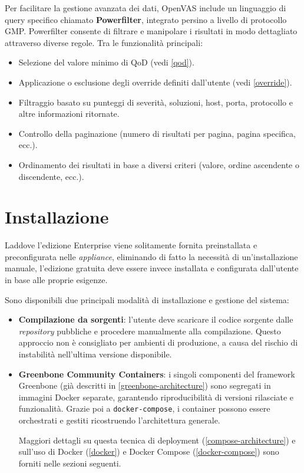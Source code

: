 Per facilitare la gestione avanzata dei dati, OpenVAS include un linguaggio di query specifico chiamato \textbf{Powerfilter}, integrato persino a livello di protocollo GMP. Powerfilter consente di filtrare e manipolare i risultati in modo dettagliato attraverso diverse regole. Tra le funzionalità principali:
\begin{itemize}
    \item Selezione del valore minimo di QoD (vedi \ref{qod}).
    \item Applicazione o esclusione degli override definiti dall'utente (vedi \ref{override}).
    \item Filtraggio basato su punteggi di severità, soluzioni, host, porta, protocollo e altre informazioni ritornate.
    \item Controllo della paginazione (numero di risultati per pagina, pagina specifica, ecc.).
    \item Ordinamento dei risultati in base a diversi criteri (valore, ordine ascendente o discendente, ecc.).
\end{itemize}

\section{Installazione}
Laddove l'edizione Enterprise viene solitamente fornita preinstallata e preconfigurata nelle \emph{appliance}, eliminando di fatto la necessità di un'installazione manuale, l'edizione gratuita deve essere invece installata e configurata dall'utente in base alle proprie esigenze.

Sono disponibili due principali modalità di installazione e gestione del sistema:

\begin{itemize}
    \item \textbf{Compilazione da sorgenti}: l'utente deve scaricare il codice sorgente dalle \emph{repository} pubbliche e procedere manualmente alla compilazione. Questo approccio non è consigliato per ambienti di produzione, a causa del rischio di instabilità nell'ultima versione disponibile.
    
    \item \textbf{Greenbone Community Containers}: i singoli componenti del framework Greenbone (già descritti in \ref{greenbone-architecture}) sono segregati in immagini Docker separate, garantendo riproducibilità di versioni rilasciate e funzionalità. Grazie poi a \texttt{docker-compose}, i container possono essere orchestrati e gestiti ricostruendo l'architettura generale.
    \label{greenbone-community-containers}

    Maggiori dettagli su questa tecnica di deployment (\ref{compose-architecture}) e sull'uso di Docker (\ref{docker}) e Docker Compose (\ref{docker-compose}) sono forniti nelle sezioni seguenti.
\end{itemize}

